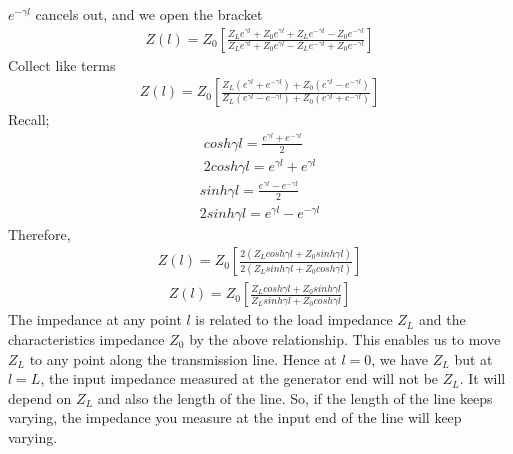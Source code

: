 $e^{-\gamma l}$ cancels out, and we open the bracket
\begin{align*}
Z(l) = Z_0 \left[\frac{Z_Le^{\gamma l} + Z_0e^{\gamma l} + Z_Le^{-\gamma l} - Z_0e^{-\gamma l}}{Z_L e^{\gamma l} + Z_0e^{\gamma l} - Z_Le^{-\gamma l} + Z_0e^{-\gamma l}}\right]
\end{align*}
Collect like terms
\begin{align*}
Z(l) = Z_0 \left[\frac{Z_L(e^{\gamma l} + e^{-\gamma l}) + Z_0(e^{\gamma l} - e^{-\gamma l})}{Z_L (e^{\gamma l} - e^{-\gamma l}) + Z_0(e^{\gamma l} + e^{-\gamma l})}\right]
\end{align*}
Recall; 
\begin{align*}
cosh\gamma l = \frac{e^{\gamma l} + e^{-\gamma l}}{2}\\
2cosh\gamma l = e^{\gamma l} + e^{\gamma l}
\end{align*}
\begin{align*}
sinh\gamma l = \frac{e^{\gamma l} - e^{-\gamma l}}{2}\\
2sinh\gamma l = e^{\gamma l} - e^{-\gamma l}
\end{align*}
Therefore,
\begin{align*}
Z(l) = Z_0\left[\frac{2(Z_Lcosh\gamma l + Z_0sinh\gamma l)}{2(Z_Lsinh\gamma l + Z_0cosh\gamma l)}\right]
\end{align*}
\begin{align}
Z(l) = Z_0\left[\frac{Z_Lcosh\gamma l + Z_0sinh\gamma l}{Z_Lsinh\gamma l + Z_0cosh\gamma l}\right]
\label{eqn:imp}
\end{align}
The impedance at any point $l$ is related to the load impedance $Z_L$ and the characteristics impedance $Z_0$ by the above relationship. This enables us to move $Z_L$ to any point along the transmission line. Hence at $l = 0$, we have $Z_L$ but at $l = L$, the input impedance measured at the generator end will not be $Z_L$. It will depend on $Z_L$ and also the length of the line. So, if the length of the line keeps varying, the impedance you measure at the input end of the line will keep varying. 

